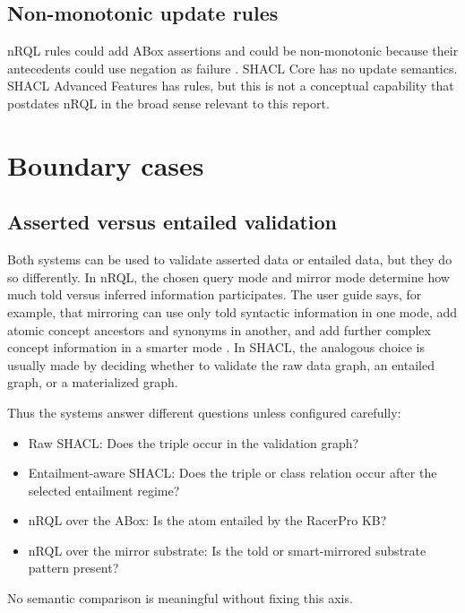 \documentclass[11pt,letterpaper]{article}
\newcommand{\nrql}{nRQL}
\newcommand{\racer}{RacerPro}
\newcommand{\shacl}{SHACL}
\newcommand{\naf}{negation as failure}
\newcommand{\abox}{ABox}
\begin{document}
\subsection{Non-monotonic update rules}

\nrql{} rules could add \abox{} assertions and could be non-monotonic because their antecedents could use \naf{} \cite[pp.~125--127]{racerug}. \shacl{} Core has no update semantics. \shacl{} Advanced Features has rules, but this is not a conceptual capability that postdates \nrql{} in the broad sense relevant to this report.

\section{Boundary cases}

\subsection{Asserted versus entailed validation}

Both systems can be used to validate asserted data or entailed data, but they do so differently. In \nrql{}, the chosen query mode and mirror mode determine how much told versus inferred information participates. The user guide says, for example, that mirroring can use only told syntactic information in one mode, add atomic concept ancestors and synonyms in another, and add further complex concept information in a smarter mode \cite[pp.~139--140]{racerug}. In \shacl{}, the analogous choice is usually made by deciding whether to validate the raw data graph, an entailed graph, or a materialized graph.

Thus the systems answer different questions unless configured carefully:

\begin{itemize}[leftmargin=2em]
  \item Raw \shacl{}: Does the triple occur in the validation graph?
  \item Entailment-aware \shacl{}: Does the triple or class relation occur after the selected entailment regime?
  \item \nrql{} over the \abox{}: Is the atom entailed by the \racer{} KB?
  \item \nrql{} over the mirror substrate: Is the told or smart-mirrored substrate pattern present?
\end{itemize}

No semantic comparison is meaningful without fixing this axis.
\end{document}

